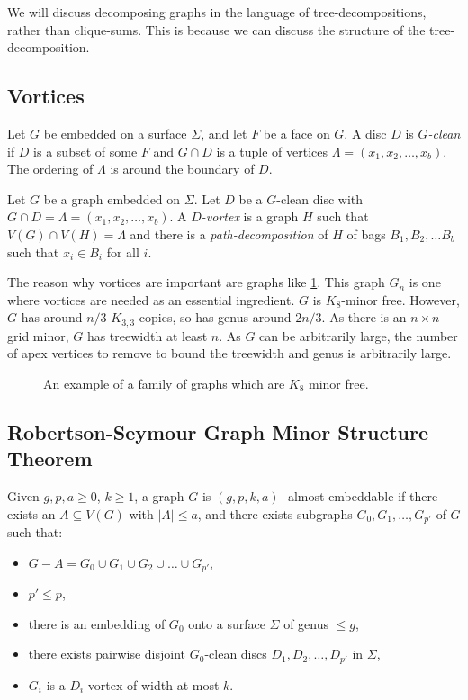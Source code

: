 We will discuss decomposing graphs in the language of tree-decompositions, rather than clique-sums. This is because we can discuss the structure of the tree-decomposition.

\subsection{Vortices}\label{sssec:vortices}
Let \(G\) be embedded on a surface \(\Sigma\), and let \(F\) be a face on \(G\). A disc $D$ is \textit{$G$-clean} if $D$ is a subset of some $F$ and $G \cap D$ is a tuple of vertices \(\Lambda = (x_1, x_2, \ldots, x_b)\). The ordering of $\Lambda$ is around the boundary of $D$. 
\par
Let $G$ be a graph embedded on $\Sigma$. Let $D$ be a $G$-clean disc with $G \cap D = \Lambda = (x_1, x_2, \ldots, x_b)$. A \textit{$D$-vortex} is a graph $H$ such that $V(G) \cap V(H) = \Lambda$ and there is a \textit{path-decomposition} of \(H\) of bags \(B_1, B_2, \ldots B_b\) such that \(x_i \in B_i\) for all \(i\).
\par
The reason why vortices are important are graphs like \cref{fig:tenniscourt}. This graph $G_n$ is one where vortices are needed as an essential ingredient. $G$ is $K_8$-minor free. However, $G$ has around $n/3$ $K_{3,3}$ copies, so has genus around $2n/3$. As there is an $n \times n$ grid minor, $G$ has treewidth at least $n$. As $G$ can be arbitrarily large, the number of apex vertices to remove to bound the treewidth and genus is arbitrarily large. 

\begin{figure}[h]
	\centering
	
	\caption{An example of a family of graphs which are \(K_8\) minor free.}
	\label{fig:tenniscourt}
\end{figure}
\subsection{Robertson-Seymour Graph Minor Structure Theorem}\label{ssec:Robertson_Seymour_Graph_Structure}
Given \(g, p, a \geq 0\), \(k \geq 1\), a graph \(G\) is \((g, p, k, a)\)- almost-embeddable if there exists an \(A \subseteq V(G)\) with \(|A| \leq a\), and there exists subgraphs \(G_0, G_1, \ldots,  G_{p'}\) of \(G\) such that:
\begin{itemize}
	\item \(G - A = G_0 \cup G_1 \cup G_2 \cup \ldots \cup G_{p'}\),
	\item \(p' \leq p\),
	\item there is an embedding of \(G_0\) onto a surface \(\Sigma\) of genus \(\leq g\),
	\item there exists pairwise disjoint \(G_0\)-clean discs \(D_1, D_2, \ldots, D_{p'}\) in \(\Sigma\),
	\item \(G_i\) is a \(D_i\)-vortex of width at most \(k\).
\end{itemize}

